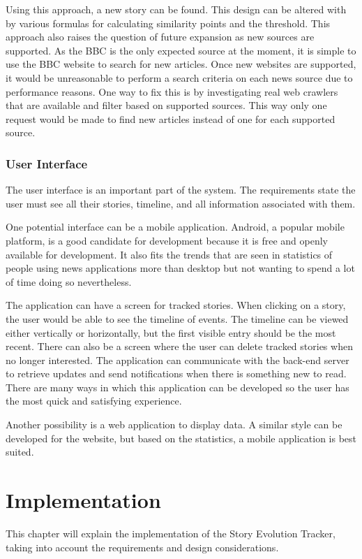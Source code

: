 \documentclass[11pt,titlepage]{report}
\begin{document}
Using this approach, a new story can be found. This design can be altered with by various formulas for calculating similarity points and the threshold. This approach also raises the question of future expansion as new sources are supported. As the BBC is the only expected source at the moment, it is simple to use the BBC website to search for new articles. Once new websites are supported, it would be unreasonable to perform a search criteria on each news source due to performance reasons. One way to fix this is by investigating real web crawlers that are available and filter based on supported sources. This way only one request would be made to find new articles instead of one for each supported source.

\subsection{User Interface}\label{design:ui}
The user interface is an important part of the system. The requirements state the user must see all their stories, timeline, and all information associated with them.

One potential interface can be a mobile application. Android, a popular mobile platform, is a good candidate for development because it is free and openly available for development. It also fits the trends that are seen in statistics of people using news applications more than desktop but not wanting to spend a lot of time doing so nevertheless.

The application can have a screen for tracked stories. When clicking on a story, the user would be able to see the timeline of events. The timeline can be viewed either vertically or horizontally, but the first visible entry should be the most recent. There can also be a screen where the user can delete tracked stories when no longer interested. The application can communicate with the back-end server to retrieve updates and send notifications when there is something new to read. There are many ways in which this application can be developed so the user has the most quick and satisfying experience.

Another possibility is a web application to display data. A similar style can be developed for the website, but based on the statistics, a mobile application is best suited. 

\chapter{Implementation}
This chapter will explain the implementation of the Story Evolution Tracker, taking into account the requirements and design considerations.
\end{document}
